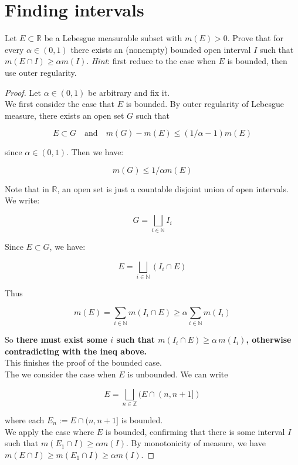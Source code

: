 \section{Finding intervals}\label{finding-intervals}

Let \(E \subset \mathbb{R}\) be a Lebesgue measurable subset with \(m(E) > 0\). Prove that for every \(\alpha \in (0,1)\) there exists an (nonempty) bounded open interval \(I\) such that \(m(E \cap I) \geq \alpha m(I)\). \emph{Hint}: first reduce to the case when \(E\) is bounded, then use outer regularity.

\begin{proof}

Let \(\alpha \in (0,1)\) be arbitrary and fix it.\\
We first consider the case that \(E\) is bounded. By outer regularity of Lebesgue measure, there exists an open set \(G\) such that

\[E \subset G\quad\text{and}\quad m(G) - m(E) \leq (1/\alpha - 1) m(E)\]

since \(\alpha \in (0,1)\). Then we have:

\[m(G) \leq 1/\alpha m(E)\]

Note that in \(\mathbb{R}\), an open set is just a countable disjoint union of open intervals. We write:

\[G = \bigsqcup\limits_{i \in \mathbb{N}}I_{i}\]

Since \(E \subset G\), we have:

\[E = \bigsqcup\limits_{i \in \mathbb{N}}(I_{i} \cap E)\]

Thus

\[m(E) = \sum\limits_{i \in \mathbb{N}}m(I_{i} \cap E) \geq \alpha\sum\limits_{i \in \mathbb{N}}m(I_{i})\]

So \textbf{there must exist some \(i\) such that \(m(I_{i} \cap E) \geq \alpha\, m(I_{i})\), otherwise contradicting with the ineq above.}\\
This finishes the proof of the bounded case.\\
The we consider the case when \(E\) is unbounded. We can write

\[E = \bigsqcup\limits_{n \in \mathbb{Z}}(E \cap (n,n + 1\rbrack)\]

where each \(E_{n} := E \cap (n,n + 1\rbrack\) is bounded.\\
We apply the case where \(E\) is bounded, confirming that there is some interval \(I\) such that \(m(E_{1} \cap I) \geq \alpha m(I)\). By monotonicity of measure, we have \(m(E \cap I) \geq m(E_{1} \cap I) \geq \alpha m(I)\).

\end{proof}

